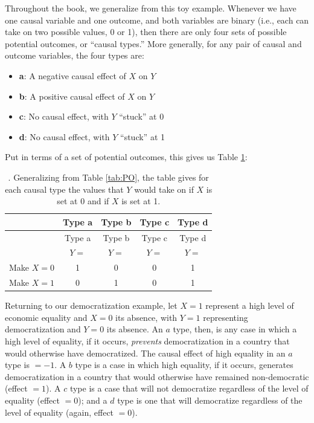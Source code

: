\documentclass[12pt,]{book}
\providecommand{\tightlist}{%
  \setlength{\itemsep}{0pt}\setlength{\parskip}{0pt}}
\begin{document}
Throughout the book, we generalize from this toy example. Whenever we have one causal variable and one outcome, and both variables are binary (i.e., each can take on two possible values, 0 or 1), then there are only four sets of possible potential outcomes, or ``causal types.'' More generally, for any pair of causal and outcome variables, the four types are:

\begin{itemize}
\tightlist
\item
  \textbf{a}: A negative causal effect of \(X\) on \(Y\)
\item
  \textbf{b}: A positive causal effect of \(X\) on \(Y\)
\item
  \textbf{c}: No causal effect, with \(Y\) ``stuck'' at 0
\item
  \textbf{d}: No causal effect, with \(Y\) ``stuck'' at 1
\end{itemize}

Put in terms of a set of potential outcomes, this gives us Table \ref{tab:POGEN}:

\begin{longtable}[]{@{}lcccc@{}}
\caption{\label{tab:POGEN}. Generalizing from Table \ref{tab:PO}, the table gives for each causal type the values that \(Y\) would take on if \(X\) is set at \(0\) and if \(X\) is set at 1.}\tabularnewline
\toprule
\small & Type a & Type b & Type c & Type d\tabularnewline
\midrule
\endfirsthead
\toprule
\small & Type a & Type b & Type c & Type d\tabularnewline
\midrule
\endhead
& \(Y=\) & \(Y=\) & \(Y=\) & \(Y=\)\tabularnewline
Make \(X=0\) & 1 & 0 & 0 & 1\tabularnewline
Make \(X=1\) & 0 & 1 & 0 & 1\tabularnewline
\bottomrule
\end{longtable}

Returning to our democratization example, let \(X=1\) represent a high level of economic equality and \(X=0\) its absence, with \(Y=1\) representing democratization and \(Y=0\) its absence. An \(a\) type, then, is any case in which a high level of equality, if it occurs, \emph{prevents} democratization in a country that would otherwise have democratized. The causal effect of high equality in an \(a\) type is \(= -1\). A \(b\) type is a case in which high equality, if it occurs, generates democratization in a country that would otherwise have remained non-democratic (effect \(= 1\)). A \(c\) type is a case that will not democratize regardless of the level of equality (effect \(= 0\)); and a \(d\) type is one that will democratize regardless of the level of equality (again, effect \(= 0\)).
\end{document}
